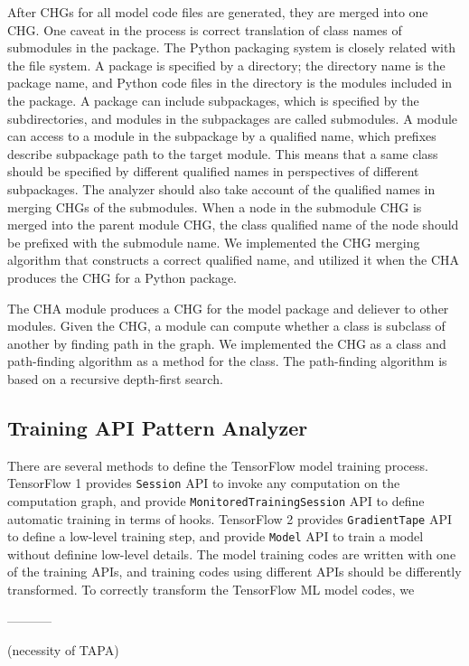 After CHGs for all model code files are generated, 
they are merged into one CHG.
One caveat in the process is correct translation of class names
of submodules in the package.
The Python packaging system is closely related with the file system.
A package is specified by a directory; 
the directory name is the package name, 
and Python code files in the directory is the modules included in the package.
A package can include subpackages, which is specified
by the subdirectories, and modules in the subpackages are called submodules.
A module can access to a module in the subpackage by a qualified name,
which prefixes describe subpackage path to the target module.
This means that a same class should be specified by different qualified
names in perspectives of different subpackages.
The analyzer should also take account of the qualified names
in merging CHGs of the submodules. 
When a node in the submodule CHG is merged into the parent module CHG,
the class qualified name of the node should be prefixed with the
submodule name.
We implemented the CHG merging algorithm that constructs a correct
qualified name, and utilized it when the CHA produces the CHG for
a Python package. 

The CHA module produces a CHG for the model package and deliever to
other modules. Given the CHG, a module can compute whether a class is
subclass of another by finding path in the graph.
We implemented the CHG as a class and path-finding algorithm as
a method for the class. The path-finding algorithm is based on
a recursive depth-first search.

\subsection{Training API Pattern Analyzer}

There are several methods to define the TensorFlow model training process.
TensorFlow 1 provides {\tt Session} API to invoke any computation
on the computation graph, and provide {\tt MonitoredTrainingSession} API to
define automatic training in terms of hooks. 
TensorFlow 2 provides {\tt GradientTape} API to define a low-level
training step, and provide {\tt Model} API to train a model without
definine low-level details.
The model training codes are written with one of the training APIs,
and training codes using different APIs should be differently transformed.
To correctly transform the TensorFlow ML model codes,
we 

-----------

(necessity of TAPA)

